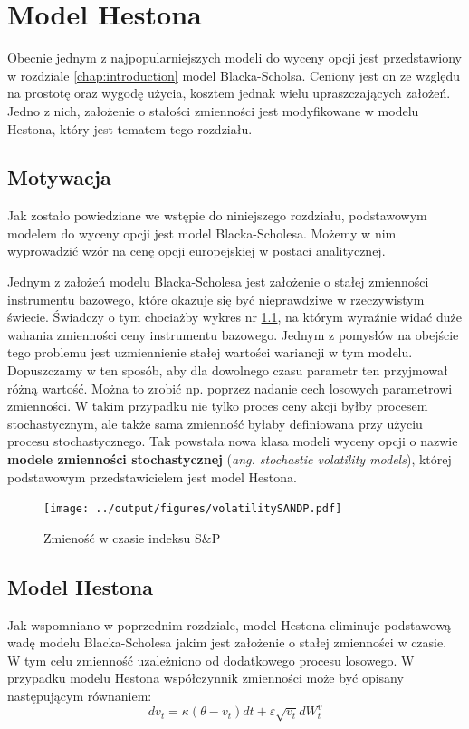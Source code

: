 \documentclass{pracamgr}
\begin{document}
\chapter{Model Hestona}
\label{chap:hestonModel}

Obecnie jednym z najpopularniejszych modeli do wyceny opcji jest przedstawiony 
w rozdziale \ref{chap:introduction} model Blacka-Scholsa. Ceniony jest 
on ze względu na prostotę oraz wygodę użycia, kosztem jednak wielu upraszczających założeń. 
Jedno z nich, założenie o stałości zmienności jest modyfikowane w modelu Hestona, który jest 
tematem tego rozdziału.


\section{Motywacja} 
Jak zostało powiedziane we wstępie do niniejszego rozdziału, podstawowym modelem do wyceny opcji jest 
model Blacka-Scholesa.
Możemy w nim wyprowadzić wzór na cenę opcji europejskiej w postaci analitycznej. 

Jednym z założeń modelu Blacka-Scholesa jest założenie o stałej zmienności instrumentu bazowego, 
które okazuje się być nieprawdziwe w rzeczywistym świecie. Świadczy o tym chociażby
wykres nr \ref{fig:vix}, na którym wyraźnie widać duże wahania zmienności ceny instrumentu bazowego.
Jednym z pomysłów na
obejście tego problemu jest uzmiennienie stałej wartości wariancji w tym modelu. Dopuszczamy w ten 
sposób, aby dla dowolnego czasu parametr ten przyjmował różną wartość. Można to zrobić np. poprzez 
nadanie cech losowych parametrowi zmienności. 
W takim przypadku nie tylko proces ceny akcji byłby procesem 
stochastycznym, ale także sama zmienność byłaby definiowana przy użyciu procesu stochastycznego. 
Tak powstała nowa klasa modeli wyceny opcji o nazwie \textbf{modele zmienności stochastycznej} 
(\textit{ang. stochastic volatility models}), której podstawowym 
przedstawicielem jest model Hestona.



\begin{figure}
  \centering  
  \texttt{[image: ../output/figures/volatilitySANDP.pdf]}
  \caption{Zmieność w czasie indeksu S\&P}\label{fig:vix}
\end{figure} 

\section{Model Hestona}
Jak wspomniano w poprzednim rozdziale, model Hestona eliminuje podstawową wadę modelu Blacka-Scholesa 
jakim jest założenie o stałej zmienności w czasie.
W tym celu zmienność uzależniono od dodatkowego procesu losowego. W 
przypadku modelu Hestona współczynnik zmienności może być opisany następującym równaniem:
\begin{equation}
\label{eq:cir}
dv_t  = \kappa (\theta  - v_t)dt + \varepsilon \sqrt{v_t} dW_t^v 
\end{equation}
\end{document}
